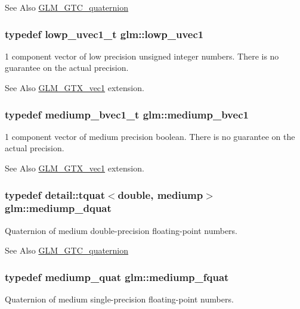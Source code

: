 \begin{DoxySeeAlso}{See Also}
\hyperlink{group__gtc__quaternion}{G\-L\-M\-\_\-\-G\-T\-C\-\_\-quaternion} 
\end{DoxySeeAlso}
\hypertarget{namespaceglm_ad50d8a6d477675ffc627f0949f1d5615}{
\subsubsection[{lowp\-\_\-uvec1}]{\setlength{\rightskip}{0pt plus 5cm}typedef {\bf lowp\-\_\-uvec1\-\_\-t} {\bf glm\-::lowp\-\_\-uvec1}}}\label{namespaceglm_ad50d8a6d477675ffc627f0949f1d5615}
1 component vector of low precision unsigned integer numbers. There is no guarantee on the actual precision. \begin{DoxySeeAlso}{See Also}
\hyperlink{group__gtx__vec1}{G\-L\-M\-\_\-\-G\-T\-X\-\_\-vec1} extension. 
\end{DoxySeeAlso}
\hypertarget{namespaceglm_a6c2cab6a7010331621a5ce656dd5f58d}{
\subsubsection[{mediump\-\_\-bvec1}]{\setlength{\rightskip}{0pt plus 5cm}typedef {\bf mediump\-\_\-bvec1\-\_\-t} {\bf glm\-::mediump\-\_\-bvec1}}}\label{namespaceglm_a6c2cab6a7010331621a5ce656dd5f58d}
1 component vector of medium precision boolean. There is no guarantee on the actual precision. \begin{DoxySeeAlso}{See Also}
\hyperlink{group__gtx__vec1}{G\-L\-M\-\_\-\-G\-T\-X\-\_\-vec1} extension. 
\end{DoxySeeAlso}
\hypertarget{namespaceglm_a302e27293c89ef6128f4eb14ea06ec8b}{
\subsubsection[{mediump\-\_\-dquat}]{\setlength{\rightskip}{0pt plus 5cm}typedef {\bf detail\-::tquat}$<$double, mediump$>$ {\bf glm\-::mediump\-\_\-dquat}}}\label{namespaceglm_a302e27293c89ef6128f4eb14ea06ec8b}
Quaternion of medium double-\/precision floating-\/point numbers.

\begin{DoxySeeAlso}{See Also}
\hyperlink{group__gtc__quaternion}{G\-L\-M\-\_\-\-G\-T\-C\-\_\-quaternion} 
\end{DoxySeeAlso}
\hypertarget{namespaceglm_a154ae157e20a677e5663d97b923b1053}{
\subsubsection[{mediump\-\_\-fquat}]{\setlength{\rightskip}{0pt plus 5cm}typedef {\bf mediump\-\_\-quat} {\bf glm\-::mediump\-\_\-fquat}}}\label{namespaceglm_a154ae157e20a677e5663d97b923b1053}
Quaternion of medium single-\/precision floating-\/point numbers.

